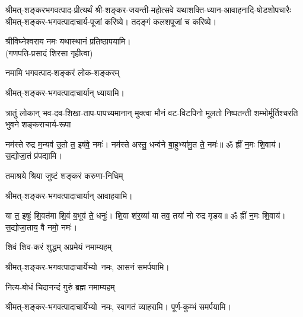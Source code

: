 श्रीमत्-शङ्करभगवत्पाद-प्रीत्यर्थं
श्री-शङ्कर-जयन्ती-महोत्सवे
यथाशक्ति-ध्यान-आवाहनादि-षोडशो\-पचारैः श्रीमत्-शङ्कर-भगवत्पादाचार्य-पूजां करिष्ये। तदङ्गं कलशपूजां च करिष्ये।

श्रीविघ्नेश्वराय नमः यथास्थानं प्रतिष्ठापयामि।\\
(गणपति-प्रसादं शिरसा गृहीत्वा)
\renewcommand{\devaName}{श्रीमत्-शङ्कर-भगवत्पादाचार्याः}













\begin{center}


\begingroup
\centering
{}
{नमामि भगवत्पाद-शङ्करं लोक-शङ्करम्}


श्रीमत्-शङ्कर-भगवत्पादाचार्यान् ध्यायामि।

{त्रातुं लोकान् भव-दव-शिखा-ताप-पापच्यमानान्}
{मुक्त्वा मौनं वट-विटपिनो मूलतो निष्पतन्ती}
{शम्भोर्मूर्तिश्चरति भुवने शङ्कराचार्य-रूपा}

नम॑स्ते रुद्र म॒न्यव॑ उ॒तो त॒ इष॑वे॒ नमः॑। नम॑स्ते अस्तु॒ धन्व॑ने बा॒हुभ्या॑मु॒त ते॒ नमः॑॥ ॐ ह्रीं न॒मः शि॒वाय॑। स॒द्योजा॒तं प्र॑पद्यामि।

{तमाश्रये श्रिया जुष्टं शङ्करं करुणा-निधिम्}

श्रीमत्-शङ्कर-भगवत्पादाचार्यान् आवाहयामि।

या त॒ इषुः॑ शि॒वत॑मा शि॒वं ब॒भूव॑ ते॒ धनुः॑। शि॒वा श॑र॒व्या॑ या तव॒ तया॑ नो रुद्र मृडय॥ ॐ ह्रीं न॒मः शि॒वाय॑। स॒द्योजा॒ताय॒ वै नमो॒ नमः॑। 

{शिवं शिव-करं शुद्धम् अप्रमेयं नमाम्यहम्}

श्रीमत्-शङ्कर-भगवत्पादाचार्येभ्यो~नमः, आसनं समर्पयामि।

{नित्य-बोधं चिदानन्दं गुरुं ब्रह्म नमाम्यहम्}

श्रीमत्-शङ्कर-भगवत्पादाचार्येभ्यो~नमः, स्वागतं व्याहरामि। पूर्ण-कुम्भं समर्पयामि।


\end{center}
